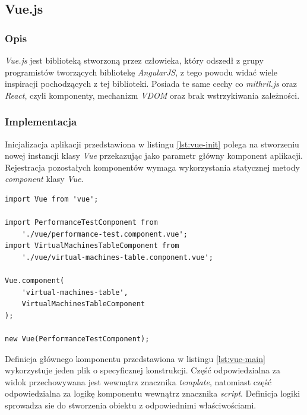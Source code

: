 \documentclass[polish, twoside, 12pt]{mwart}
\begin{document}
\subsection{Vue.js}

\subsubsection{Opis}

\emph{Vue.js} \cite{vue.js} jest biblioteką stworzoną przez człowieka, który odszedł z grupy programistów tworzących bibliotekę \emph{AngularJS}, z tego powodu widać wiele inspiracji pochodzących z tej biblioteki.
Posiada te same cechy co \emph{mithril.js} oraz \emph{React}, czyli komponenty, mechanizm \emph{VDOM} oraz brak wstrzykiwania zależności.

\subsubsection{Implementacja}

Inicjalizacja aplikacji przedstawiona w listingu \ref{lst:vue-init} polega na stworzeniu nowej instancji klasy \emph{Vue} przekazując jako parametr główny komponent aplikacji. Rejestracja pozostałych komponentów wymaga wykorzystania statycznej metody \emph{component} klasy \emph{Vue}.

\begin{lstlisting}[caption=Inicjalizacja głównego komponentu, label={lst:vue-init}]
import Vue from 'vue';

import PerformanceTestComponent from
    './vue/performance-test.component.vue';
import VirtualMachinesTableComponent from
    './vue/virtual-machines-table.component.vue';

Vue.component(
    'virtual-machines-table',
    VirtualMachinesTableComponent
);

new Vue(PerformanceTestComponent);
\end{lstlisting}

Definicja głównego komponentu przedstawiona w listingu \ref{lst:vue-main} wykorzystuje jeden plik o specyficznej konstrukcji. Część odpowiedzialna za widok przechowywana jest wewnątrz znacznika \emph{template}, natomiast część odpowiedzialna za logikę komponentu wewnątrz znacznika \emph{script}. Definicja logiki sprowadza sie do stworzenia obiektu z odpowiednimi właściwościami.
\end{document}
